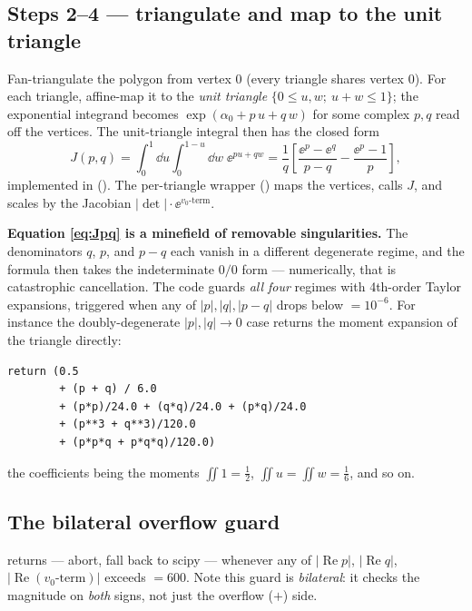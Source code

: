 \subsection{Steps 2--4 --- triangulate and map to the unit triangle}

Fan-triangulate the polygon from vertex $0$ (every triangle shares vertex $0$).
For each triangle, affine-map it to the \emph{unit triangle}
$\{0\le u, w;\ u+w\le 1\}$; the exponential integrand becomes
$\exp(\alpha_0 + p\,u + q\,w)$ for some complex $p, q$ read off the vertices. The
unit-triangle integral then has the closed form
\begin{equation}
  J(p, q) = \int_0^1\!\dd u\int_0^{1-u}\!\dd w\;\ee^{p u + q w}
   = \frac{1}{q}\left[\frac{\ee^{p} - \ee^{q}}{p - q} - \frac{\ee^{p} - 1}{p}\right],
  \label{eq:Jpq}
\end{equation}
implemented in  ().
The per-triangle wrapper  ()
maps the vertices, calls $J$, and scales by the Jacobian
$|\det|\cdot\ee^{v_0\text{-term}}$.

\begin{gotcha}
\textbf{Equation \eqref{eq:Jpq} is a minefield of removable singularities.} The
denominators $q$, $p$, and $p-q$ each vanish in a different degenerate regime,
and the formula then takes the indeterminate $0/0$ form --- numerically, that is
catastrophic cancellation. The code guards \emph{all four} regimes with
4th-order Taylor expansions, triggered when any of $|p|, |q|, |p-q|$ drops below
 $= 10^{-6}$. For instance the doubly-degenerate
$|p|,|q|\to 0$ case returns the moment expansion of the triangle directly:
\begin{lstlisting}
return (0.5
        + (p + q) / 6.0
        + (p*p)/24.0 + (q*q)/24.0 + (p*q)/24.0
        + (p**3 + q**3)/120.0
        + (p*p*q + p*q*q)/120.0)
\end{lstlisting}
the coefficients being the moments $\iint 1 = \tfrac12$, $\iint u = \iint w =
\tfrac16$, and so on.
\end{gotcha}

\subsection{The bilateral overflow guard}

 returns  --- abort, fall back to scipy ---
whenever any of $|\operatorname{Re} p|$, $|\operatorname{Re} q|$,
$|\operatorname{Re}(v_0\text{-term})|$ exceeds  $= 600$.
Note this guard is \emph{bilateral}: it checks the magnitude on \emph{both} signs,
not just the overflow ($+$) side.

